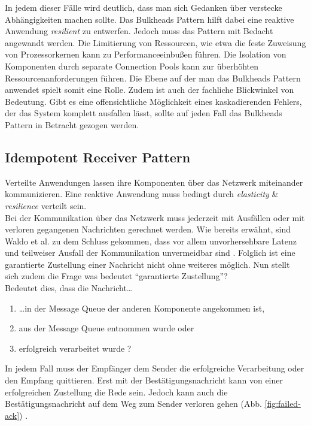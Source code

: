 In jedem dieser Fälle wird deutlich, dass man sich Gedanken über verstecke Abhängigkeiten machen sollte. Das Bulkheads Pattern hilft dabei eine reaktive Anwendung \textit{resilient} zu entwerfen. Jedoch muss das Pattern mit Bedacht angewandt werden. Die Limitierung von Ressourcen, wie etwa die feste Zuweisung von Prozessorkernen kann zu Performanceeinbußen führen. Die Isolation von Komponenten durch separate Connection Pools kann zur überhöhten Ressourcenanforderungen führen. Die Ebene auf der man das Bulkheads Pattern anwendet spielt somit eine Rolle. Zudem ist auch der fachliche Blickwinkel von Bedeutung. Gibt es eine offensichtliche Möglichkeit eines kaskadierenden Fehlers, der das System komplett ausfallen lässt, sollte auf jeden Fall das Bulkheads Pattern in Betracht gezogen werden.

\pagebreak

\subsection{Idempotent Receiver Pattern}
Verteilte Anwendungen lassen ihre Komponenten über das Netzwerk miteinander kommunizieren. Eine reaktive Anwendung muss bedingt durch \textit{elasticity} \& \textit{resilience} verteilt sein.\\
Bei der Kommunikation über das Netzwerk muss jederzeit mit Ausfällen oder mit verloren gegangenen Nachrichten gerechnet werden. Wie bereits erwähnt, sind Waldo et al. zu dem Schluss gekommen, dass vor allem unvorhersehbare Latenz und teilweiser Ausfall der Kommunikation unvermeidbar sind \cite{waldo_note_1994}. Folglich ist eine garantierte Zustellung einer Nachricht nicht ohne weiteres möglich. Nun stellt sich zudem die Frage was bedeutet \enquote{garantierte Zustellung}?\\
Bedeutet dies, dass die Nachricht\ldots

\begin{enumerate}
\item \ldots in der Message Queue der anderen Komponente angekommen ist,
\item aus der Message Queue entnommen wurde oder
\item erfolgreich verarbeitet wurde \cite{akka_message_2016}?
\end{enumerate}

In jedem Fall muss der Empfänger dem Sender die erfolgreiche Verarbeitung oder den Empfang quittieren. Erst mit der Bestätigungsnachricht kann von einer erfolgreichen Zustellung die Rede sein. Jedoch kann auch die Bestätigungsnachricht auf dem Weg zum Sender verloren gehen (Abb. \ref{fig:failed-ack}) \cite[S.~528]{hohpe_enterprise_2004}.

